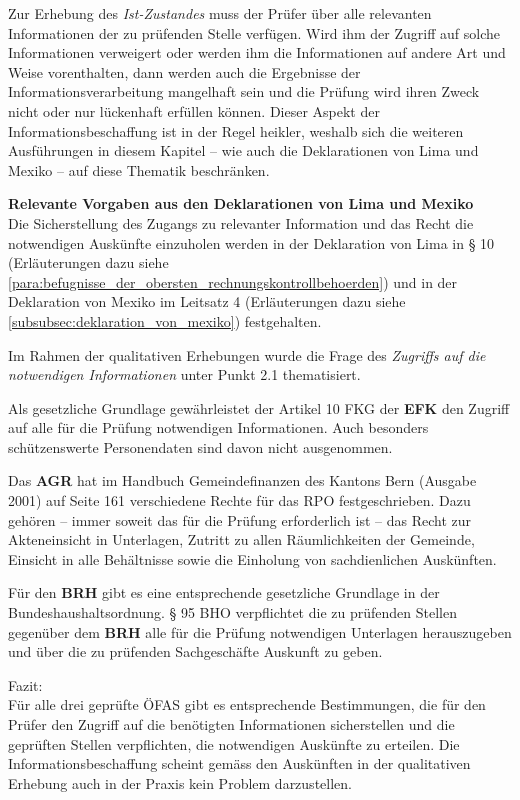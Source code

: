 \documentclass[10pt]{article}
\begin{document}
Zur Erhebung des \textit{Ist-Zustandes} muss der Prüfer über alle relevanten Informationen der zu prüfenden Stelle verfügen. Wird ihm der Zugriff auf solche Informationen verweigert oder werden ihm die Informationen auf andere Art und Weise vorenthalten, dann werden auch die Ergebnisse der Informationsverarbeitung mangelhaft sein und die Prüfung wird ihren Zweck nicht oder nur lückenhaft erfüllen können. Dieser Aspekt der Informationsbeschaffung ist in der Regel heikler, weshalb sich die weiteren Ausführungen in diesem Kapitel -- wie auch die Deklarationen von Lima und Mexiko -- auf diese Thematik beschränken.

\begin{shaded}
\textbf{Relevante Vorgaben aus den Deklarationen von Lima und Mexiko}\\
Die Sicherstellung des Zugangs zu relevanter Information und das Recht die notwendigen Auskünfte einzuholen werden in der Deklaration von Lima in § 10 (Erläuterungen dazu siehe \vref{para:befugnisse_der_obersten_rechnungskontrollbehoerden}) und in der Deklaration von Mexiko im Leitsatz 4 (Erläuterungen dazu siehe \vref{subsubsec:deklaration_von_mexiko}) festgehalten.

\end{shaded}
Im Rahmen der qualitativen Erhebungen wurde die Frage des \textit{Zugriffs auf die notwendigen Informationen} unter Punkt 2.1 thematisiert. 

Als gesetzliche Grundlage gewährleistet der Artikel 10 FKG der \textbf{EFK} den Zugriff auf alle für die Prüfung notwendigen Informationen. Auch besonders schützenswerte Personendaten sind davon nicht ausgenommen.

Das \textbf{AGR} hat im Handbuch Gemeindefinanzen des Kantons Bern (Ausgabe 2001) auf Seite 161 verschiedene Rechte für das RPO festgeschrieben. Dazu gehören -- immer soweit das für die Prüfung erforderlich ist -- das Recht zur Akteneinsicht in Unterlagen, Zutritt zu allen Räumlichkeiten der Gemeinde, Einsicht in alle Behältnisse sowie die Einholung von sachdienlichen Auskünften.

Für den \textbf{BRH} gibt es eine entsprechende gesetzliche Grundlage in der Bundeshaushaltsordnung. § 95 BHO verpflichtet die zu prüfenden Stellen gegenüber dem \textbf{BRH} alle für die Prüfung notwendigen Unterlagen herauszugeben und über die zu prüfenden Sachgeschäfte Auskunft zu geben.

Fazit:\\
Für alle drei geprüfte ÖFAS gibt es entsprechende Bestimmungen, die für den Prüfer den Zugriff auf die benötigten Informationen sicherstellen und die geprüften Stellen verpflichten, die notwendigen Auskünfte zu erteilen. Die Informationsbeschaffung scheint gemäss den Auskünften in der qualitativen Erhebung auch in der Praxis kein Problem darzustellen.
\end{document}
